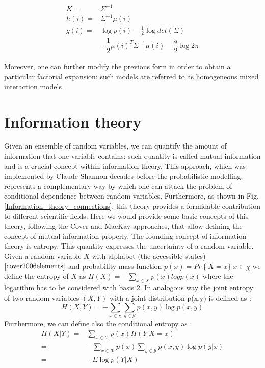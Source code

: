 \documentclass[12pt,%
               a4paper,%
               oneside,openany,%
               titlepage,%
               headinclude,footinclude,%
               BCOR5mm,%
               cleardoublepage=empty,%
               tablecaptionabove,%
               floatperchapter,
               ]{scrreprt}                 %
\begin{document}
\begin{equation}
\begin{split}
K=&\Sigma^{-1} \\
h(i)=&\Sigma^{-1}\mu(i) \\
g(i)=&\log p(i) -\frac{1}{2}\log det (\Sigma) \\
&-\dfrac{1}{2}\mu(i)^{T}\Sigma^{-1}\mu(i)-\dfrac{q}{2}\log 2\pi
\end{split}
\end{equation}

Moreover, one can further modify the previous form in order to obtain a particular factorial expansion: such models are referred to as homogeneous mixed interaction models \cite{hojsgaard2012graphical}.

\section{Information theory}
Given an ensemble of random variables, we can quantify the amount of information that one variable contains: such quantity is called mutual information and is a crucial concept within information theory. This approach, which was implemented by Claude Shannon decades before the probabilistic modelling, represents a complementary way by which one can attack the problem of conditional dependence between random variables. Furthermore, as shown in Fig. \ref{Information_theory_connections}, this theory provides a formidable contribution to different scientific fields. Here we would provide some basic concepts of this theory, following the Cover \cite{cover2006elements} and MacKay \cite{mackay2003information} approaches, that allow defining the concept of mutual information properly. The founding concept of information theory is entropy. This quantity expresses the uncertainty of a random variable. Given a random variable $X$ with alphabet (the accessible states) $\cite{cover2006elements}$ and probability mass function $p(x)=Pr\left\lbrace X=x \rbrace\; x \in \chi$ we define the entropy of $X$ as $H(X)=-\sum_{x \in X} p(x)log p(x)$ where the logarithm has to be considered with basis 2. In analogous way the joint entropy of two random variables $(X,Y)$ with a joint distribution p(x,y) is defined as \cite{cover2006elements}:
\begin{equation}
H(X,Y)=-\sum_{x\in \chi}\sum_{y\in \mathcal{Y}}p(x,y)\log p(x,y)
\end{equation}
Furthermore, we can define also the conditional entropy as \cite{cover2006elements}:
\begin{equation}
\begin{split}
H(X|Y)=& \sum_{x\in \mathcal{X} }p(x)H(Y|X=x)\\
=& -\sum_{x\in \mathcal{X}}p(x)\sum_{y\in \mathcal{Y}}p(x,y)\log p(y|x) \\
=& -E\log p(Y|X)
\end{split}
\end{equation}
\end{document}

